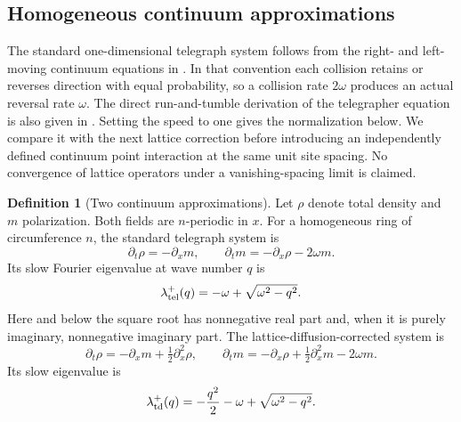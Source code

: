 \documentclass[twoside,10pt]{article}
\numberwithin{equation}{section}
\theoremstyle{slbody}
\theoremstyle{definition}
\newtheorem{definition}[theorem]{Definition}
\theoremstyle{remark}
\begin{document}
\subsection{Homogeneous continuum approximations}

The standard one-dimensional telegraph system follows from the
right- and left-moving continuum equations in
\cite[Sec.~II, Eqs.~(2.2)--(2.4)]{Schnitzer1993}.  In that convention each
collision retains or reverses direction with equal probability, so a
collision rate $2\omega$ produces an actual reversal rate $\omega$.
The direct run-and-tumble derivation of the telegrapher equation is also
given in \cite[Sec.~2, Eqs.~(1)--(7)]{Angelani2015}.
Setting the speed to one gives the normalization below.  We compare it
with the next lattice correction before introducing an independently
defined continuum point interaction at the same unit site spacing.  No
convergence of lattice operators under a vanishing-spacing limit is claimed.

\begin{definition}[Two continuum approximations]\label{def:telegraph}
Let $\rho$ denote total density and $m$ polarization.  Both fields are
$n$-periodic in $x$.  For a homogeneous ring of circumference $n$, the
standard telegraph system is
\begin{equation}\label{eq:telegraph-system}
 \partial_t\rho=-\partial_xm,
 \qquad
 \partial_tm=-\partial_x\rho-2\omega m.
\end{equation}
Its slow Fourier eigenvalue at wave number $q$ is
\begin{equation}\label{eq:telegraph-eigenvalue}
 \lambda_{\rm tel}^+(q)=-\omega+\sqrt{\omega^2-q^2}.
\end{equation}
Here and below the square root has nonnegative real part and, when it is
purely imaginary, nonnegative imaginary part.
The lattice-diffusion-corrected system is
\begin{equation}\label{eq:corrected-telegraph-system}
 \partial_t\rho=-\partial_xm+\tfrac12\partial_x^2\rho,
 \qquad
 \partial_tm=-\partial_x\rho+\tfrac12\partial_x^2m-2\omega m.
\end{equation}
Its slow eigenvalue is
\begin{equation}\label{eq:corrected-telegraph-eigenvalue}
 \lambda_{\rm td}^+(q)=-\frac{q^2}{2}-\omega
                         +\sqrt{\omega^2-q^2}.
\end{equation}
\end{definition}
\end{document}
